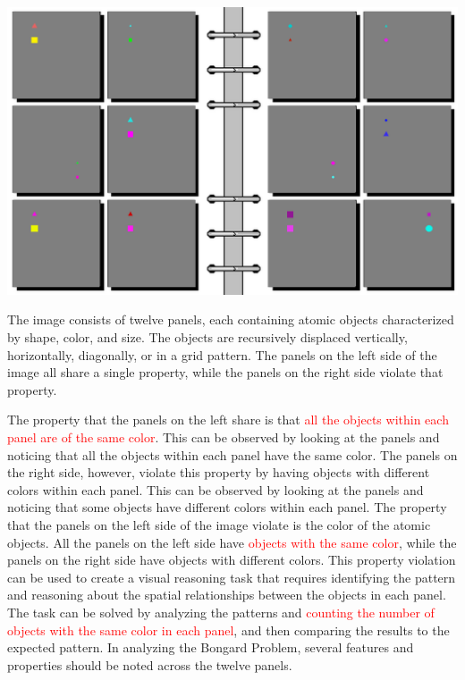 \begin{tcolorbox}[breakable,enhanced jigsaw,opacityback=0,]
	\centering
	\includegraphics[width=.8\linewidth]{imgs/bongard/easy-15.png}\\
	\begin{dialogue}
		 The image consists of twelve panels, each containing atomic objects characterized by shape, color, and size. The objects are recursively displaced vertically, horizontally, diagonally, or in a grid pattern. The panels on the left side of the image all share a single property, while the panels on the right side violate that property.
		
		The property that the panels on the left share is that \textcolor{red}{all the objects within each panel are of the same color}. This can be observed by looking at the panels and noticing that all the objects within each panel have the same color. The panels on the right side, however, violate this property by having objects with different colors within each panel. This can be observed by looking at the panels and noticing that some objects have different colors within each panel.
		\vspace{1em}
		 The property that the panels on the left side of the image violate is the color of the atomic objects. All the panels on the left side have \textcolor{red}{objects with the same color}, while the panels on the right side have objects with different colors. This property violation can be used to create a visual reasoning task that requires identifying the pattern and reasoning about the spatial relationships between the objects in each panel. The task can be solved by analyzing the patterns and \textcolor{red}{counting the number of objects with the same color in each panel}, and then comparing the results to the expected pattern.
		\vspace{1em}
		 In analyzing the Bongard Problem, several features and properties should be noted across the twelve panels.
		

\end{dialogue}
\end{tcolorbox}
